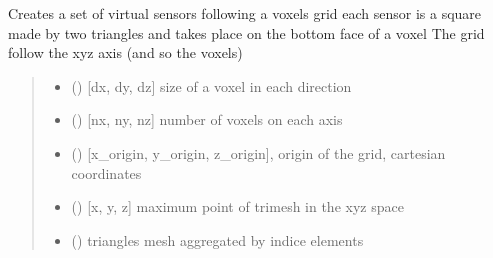 \documentclass[letterpaper,10pt,english]{sphinxmanual}
\begin{document}

\begin{fulllineitems}
\label{\detokenize{reference:CARIBUinputs.create_caribu_legume_sensors}}
\pysigstartsignatures
{}
\pysigstopsignatures
\sphinxAtStartPar
Creates a set of virtual sensors following a voxels grid
each sensor is a square made by two triangles and takes place on the bottom face of a voxel
The grid follow the xyz axis (and so the voxels)
\begin{quote}\begin{description}
\begin{itemize}
\item {} 
\sphinxAtStartPar
{} () \textendash{} {[}dx, dy, dz{]} size of a voxel in each direction

\item {} 
\sphinxAtStartPar
{} () \textendash{} {[}nx, ny, nz{]} number of voxels on each axis

\item {} 
\sphinxAtStartPar
{} (\sphinxstyleliteralemphasis{\sphinxupquote{)}}) \textendash{} {[}x\_origin, y\_origin, z\_origin{]}, origin of the grid, cartesian coordinates

\item {} 
\sphinxAtStartPar
{} (\sphinxstyleliteralemphasis{\sphinxupquote{)}}) \textendash{} {[}x, y, z{]} maximum point of trimesh in the xyz space

\item {} 
\sphinxAtStartPar
{} () \textendash{} 
\sphinxAtStartPar
triangles mesh aggregated by indice elements


\end{itemize}
\end{description}
\end{quote}
\end{fulllineitems}
\end{document}

